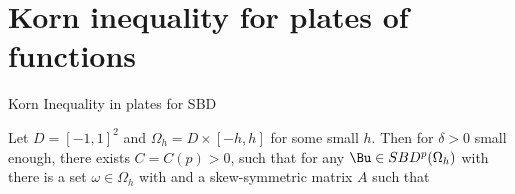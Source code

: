 \documentclass{beamer}
\begin{document}
\section{Korn inequality for plates  of  functions} 
\begin{frame}{Korn Inequality in plates for SBD}
    \begin{theorem}[A. 2023] Let $D=[-1,1]^2$ and $\Omega_h = D\times[-h,h]$ for some small $h$. Then for $\delta>0$ small enough, there exists $C = C(p)>0$, such that for any $\Bu\in SBD^p(\Omega_h)$ with  there is a set $\omega\in\Omega_h$ with   and a skew-symmetric matrix $A$ such that
    \end{theorem}
\end{frame}
\end{document}
